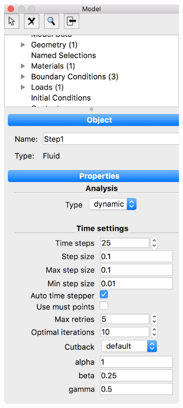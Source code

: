 \begin{figure}[!ht]
\begin{subfigure}[b]{0.25\textwidth}
\includegraphics[width=\linewidth]{figuras_4/06_pre_step-1.png}

\end{subfigure}
\end{figure}
